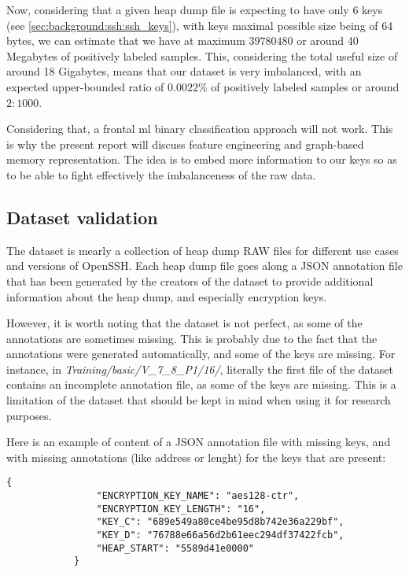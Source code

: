     Now, considering that a given heap dump file is expecting to have only 6 keys (see \autoref{sec:background:ssh:ssh_keys}), with keys maximal possible size being of 64 bytes, we can estimate that we have at maximum $ 39780480 $ or around 40 Megabytes of positively labeled samples. This, considering the total useful size of around 18 Gigabytes, means that our dataset is very imbalanced, with an expected upper-bounded ratio of $ 0.0022\% $ of positively labeled samples or around $ 2:1000 $.

    Considering that, a frontal \acrshort{ml} binary classification approach will not work. This is why the present report will discuss feature engineering and graph-based memory representation. The idea is to embed more information to our keys so as to be able to fight effectively the imbalanceness of the raw data.

    \subsection{Dataset validation}
    The dataset is mearly a collection of heap dump RAW files for different use cases and versions of OpenSSH. Each heap dump file goes along a JSON annotation file that has been generated by the creators of the dataset to provide additional information about the heap dump, and especially encryption keys.
    
    However, it is worth noting that the dataset is not perfect, as some of the annotations are sometimes missing. This is probably due to the fact that the annotations were generated automatically, and some of the keys are missing. For instance, in \textit{Training/basic/V\_7\_8\_P1/16/}, literally the first file of the dataset contains an incomplete annotation file, as some of the keys are missing. This is a limitation of the dataset that should be kept in mind when using it for research purposes.

    \begin{minipage}{\dimexpr\linewidth-20pt}
        Here is an example of content of a JSON annotation file with missing keys, and with missing annotations (like address or lenght) for the keys that are present:

        \begin{lstlisting}[style=json, caption={Missing keys in JSON annotation file \textit{Training/basic/V\_6\_0\_P1/16/24375-1644243522.json}}]
            {
                "ENCRYPTION_KEY_NAME": "aes128-ctr",
                "ENCRYPTION_KEY_LENGTH": "16",
                "KEY_C": "689e549a80ce4be95d8b742e36a229bf",
                "KEY_D": "76788e66a56d2b61eec294df37422fcb",
                "HEAP_START": "5589d41e0000"
            }
        \end{lstlisting}
    \end{minipage}

